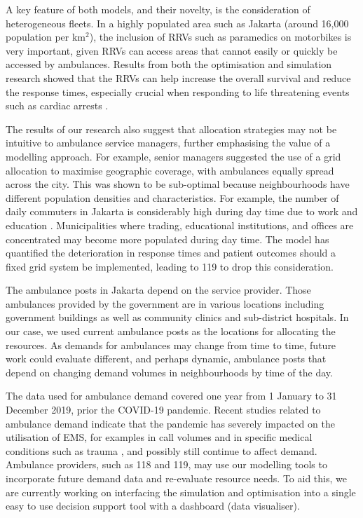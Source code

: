 \documentclass[preprint,12pt]{elsarticle}
\begin{document}
A key feature of both models, and their novelty, is the consideration of
heterogeneous fleets. In a highly populated area such as Jakarta (around
16,000 population per km$^2$), the inclusion of RRVs such as paramedics on
motorbikes is very important, given RRVs can access areas that cannot easily
or quickly be accessed by ambulances. Results from both the optimisation and
simulation research showed that the RRVs can help increase the overall
survival and reduce the response times, especially crucial when responding to
life threatening events such as cardiac arrests \cite{holmen2020shortening}. 

The results of our research also suggest that allocation strategies may not be
intuitive to ambulance service managers, further emphasising the value of a
modelling approach. For example, senior managers suggested the use of a grid
allocation to maximise geographic coverage, with ambulances equally spread
across the city. This was shown to be sub-optimal because neighbourhoods have
different population densities and characteristics. For example, the number of
daily commuters in Jakarta is considerably high during day time due to work
and education \cite{BPS_Jakarta_migrasi}. Municipalities where trading,
educational institutions, and offices are concentrated may become more
populated during day time. The model has quantified the deterioration in
response times and patient outcomes should a fixed grid system be implemented,
leading to 119 to drop this consideration.

The ambulance posts in Jakarta depend on the service provider. Those
ambulances provided by the government are in various locations including
government buildings as well as community clinics and sub-district hospitals.
In our case, we used current ambulance posts as the locations for allocating
the resources. As demands for ambulances may change from time to time, future
work could evaluate different, and perhaps dynamic, ambulance posts that
depend on changing demand volumes in neighbourhoods by time of the day.

The data used for ambulance demand covered one year from 1 January to 31
December 2019, prior the COVID-19 pandemic. Recent studies related to
ambulance demand indicate that the  pandemic has severely impacted on the
utilisation of EMS, for examples in call volumes \cite{csan2021effects} and in
specific medical conditions such as trauma \cite{ azbel2021effects}, and
possibly still continue to affect demand. Ambulance providers, such as 118 and
119, may use our modelling tools to incorporate future demand data and
re-evaluate resource needs. To aid this, we are currently working on
interfacing the simulation and optimisation into a single easy to use decision
support tool with a dashboard (data visualiser). 
\end{document}
